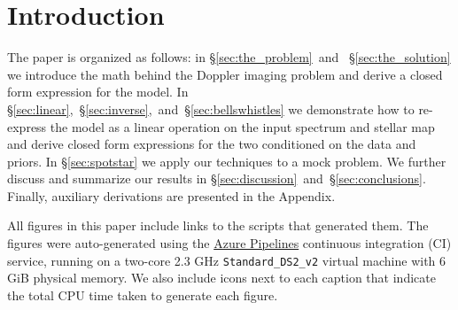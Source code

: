 \documentclass[modern]{aastex62}
\begin{document}
\section{Introduction}
%
%

The paper is organized as follows: in \S\ref{sec:the_problem}~and~%
\S\ref{sec:the_solution} we introduce the math behind the Doppler imaging
problem and derive a closed form expression for the model. In
\S\ref{sec:linear},~\S\ref{sec:inverse},~and~\S\ref{sec:bellswhistles} 
we demonstrate how to re-express 
the model as a linear operation on the input spectrum and stellar map and
derive closed form expressions for the two conditioned on the data and priors.
In \S\ref{sec:spotstar} we apply our techniques to a mock problem. We
further discuss and summarize our results in
\S\ref{sec:discussion}~and~\S\ref{sec:conclusions}. Finally, auxiliary
derivations are presented in the Appendix.

%

All figures in this paper include links {\color{linkcolor}\faFileCodeO}
to the \Python scripts that generated them. The figures were auto-generated
using the 
\href{https://dev.azure.com/rodluger/paparazzi/_build}{Azure Pipelines}
continuous integration (CI) service, running on
a two-core 2.3 GHz \texttt{Standard\_DS2\_v2} virtual machine with 6 GiB physical memory.
We also include icons next to each caption  that
indicate the total CPU time taken to generate each figure.
\end{document}
